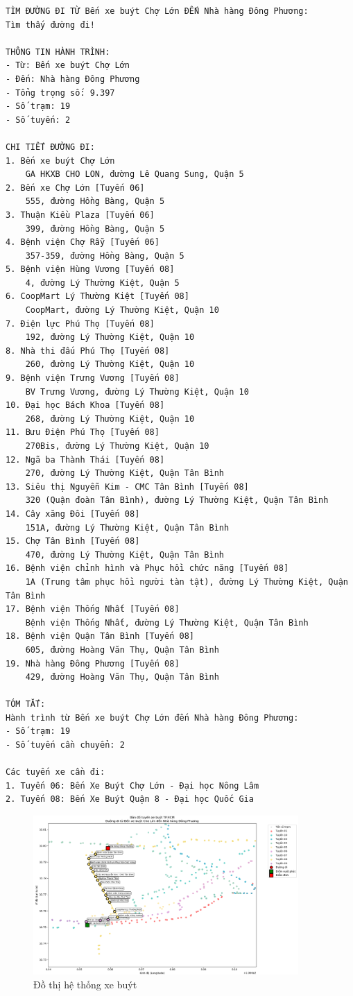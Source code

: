 \documentclass[a4paper,12pt]{article}
\begin{document}
\begin{verbatim}
TÌM ĐƯỜNG ĐI TỪ Bến xe buýt Chợ Lớn ĐẾN Nhà hàng Đông Phương:
Tìm thấy đường đi!

THÔNG TIN HÀNH TRÌNH:
- Từ: Bến xe buýt Chợ Lớn
- Đến: Nhà hàng Đông Phương
- Tổng trọng số: 9.397
- Số trạm: 19
- Số tuyến: 2

CHI TIẾT ĐƯỜNG ĐI:
1. Bến xe buýt Chợ Lớn
    GA HKXB CHO LON, đường Lê Quang Sung, Quận 5
2. Bến xe Chợ Lớn [Tuyến 06]
    555, đường Hồng Bàng, Quận 5
3. Thuận Kiều Plaza [Tuyến 06]
    399, đường Hồng Bàng, Quận 5
4. Bệnh viện Chợ Rẫy [Tuyến 06]
    357-359, đường Hồng Bàng, Quận 5
5. Bệnh viện Hùng Vương [Tuyến 08]
    4, đường Lý Thường Kiệt, Quận 5
6. CoopMart Lý Thường Kiệt [Tuyến 08]
    CoopMart, đường Lý Thường Kiệt, Quận 10
7. Điện lực Phú Thọ [Tuyến 08]
    192, đường Lý Thường Kiệt, Quận 10
8. Nhà thi đấu Phú Thọ [Tuyến 08]
    260, đường Lý Thường Kiệt, Quận 10
9. Bệnh viện Trưng Vương [Tuyến 08]
    BV Trưng Vương, đường Lý Thường Kiệt, Quận 10
10. Đại học Bách Khoa [Tuyến 08]
    268, đường Lý Thường Kiệt, Quận 10
11. Bưu Điện Phú Thọ [Tuyến 08]
    270Bis, đường Lý Thường Kiệt, Quận 10
12. Ngã ba Thành Thái [Tuyến 08]
    270, đường Lý Thường Kiệt, Quận Tân Bình
13. Siêu thị Nguyễn Kim - CMC Tân Bình [Tuyến 08]
    320 (Quận đoàn Tân Bình), đường Lý Thường Kiệt, Quận Tân Bình
14. Cây xăng Đôi [Tuyến 08]
    151A, đường Lý Thường Kiệt, Quận Tân Bình
15. Chợ Tân Bình [Tuyến 08]
    470, đường Lý Thường Kiệt, Quận Tân Bình
16. Bệnh viện chỉnh hình và Phục hồi chức năng [Tuyến 08]
    1A (Trung tâm phục hồi người tàn tật), đường Lý Thường Kiệt, Quận Tân Bình
17. Bệnh viện Thống Nhất [Tuyến 08]
    Bệnh viện Thống Nhất, đường Lý Thường Kiệt, Quận Tân Bình
18. Bệnh viện Quận Tân Bình [Tuyến 08]
    605, đường Hoàng Văn Thụ, Quận Tân Bình
19. Nhà hàng Đông Phương [Tuyến 08]
    429, đường Hoàng Văn Thụ, Quận Tân Bình

TÓM TẮT:
Hành trình từ Bến xe buýt Chợ Lớn đến Nhà hàng Đông Phương:
- Số trạm: 19
- Số tuyến cần chuyển: 2

Các tuyến xe cần đi:
1. Tuyến 06: Bến Xe Buýt Chợ Lớn - Đại học Nông Lâm
2. Tuyến 08: Bến Xe Buýt Quận 8 - Đại học Quốc Gia
\end{verbatim}

\begin{figure}[h]
    \centering
    \includegraphics[width=0.9\textwidth]{images/bus-graph.png}
    \caption{Đồ thị hệ thống xe buýt}
    \label{fig:bus-graph}
\end{figure}
\end{document}
